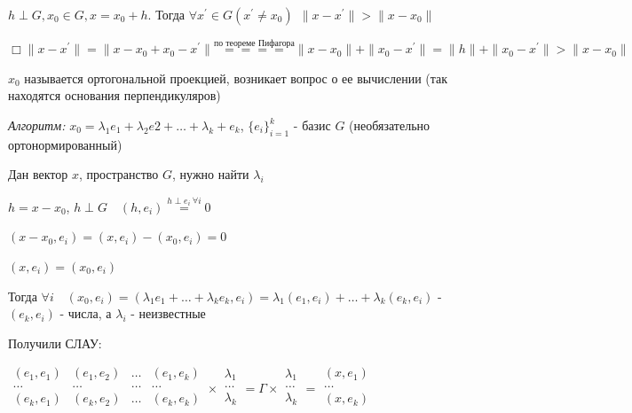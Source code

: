 \documentclass[12pt]{article}
\begin{document}
    \Th $\displaystyle h \perp G, x_0 \in G, x = x_0 + h$. Тогда $\displaystyle \forall x^\prime \in G (x^\prime \neq x_0) \ \ \|x - x^\prime\| > \|x - x_0\|$

    $\displaystyle \Box \|x - x^\prime\| = \|x - x_0 + x_0 - x^\prime\| \stackrel{\text{по теореме Пифагора}}{====} \|x - x_0\| + \|x_0 - x^\prime\| = \|h\| + \|x_0 - x^\prime\| > \|x - x_0\|$

    \Nota $\displaystyle x_0$ называется ортогональной проекцией, возникает вопрос о ее вычислении (так находятся основания перпендикуляров)

    \vspace{5mm}

    \textit{Алгоритм:} $\displaystyle x_0 = \lambda_1 e_1 + \lambda_2 e2 + \dots + \lambda_k + e_k$, $\displaystyle \{e_i\}^k_{i=1}$ - базис $G$ (необязательно ортонормированный)

    Дан вектор $x$, пространство $G$, нужно найти $\displaystyle \lambda_i$

    $\displaystyle h = x - x_0$, $\displaystyle h \perp G \quad  (h, e_i) \stackrel{h \perp e_i \ \forall i}{=} 0$

    $\displaystyle (x - x_0, e_i) = (x, e_i) - (x_0, e_i) = 0$

    $\displaystyle (x, e_i) = (x_0, e_i)$

    Тогда $\displaystyle \forall i \quad (x_0, e_i) = (\lambda_1 e_1 + \dots + \lambda_k e_k, e_i) = \lambda_1 (e_1, e_i) + \dots + \lambda_k (e_k, e_i)$ - $\displaystyle (e_k, e_i)$ - числа, а $\displaystyle \lambda_i$ - неизвестные

    Получили СЛАУ:

    $\displaystyle \begin{array}{|cccc|}
    (e_1, e_1) & (e_1, e_2) & \ldots & (e_1, e_k)\\
    \ldots & \ldots & \ldots & \ldots\\
    (e_k, e_1) & (e_k, e_2) & \ldots & (e_k, e_k)\\
    \end{array} \times \begin{array}{|c|}
    \lambda_1\\
    \ldots\\
    \lambda_k \\
    \end{array} = \Gamma \times \begin{array}{|c|}
    \lambda_1\\
    \ldots\\
    \lambda_k \\
    \end{array} = \begin{array}{|c|}
    (x,e_1)\\
    \ldots\\
    (x,e_k) \\
    \end{array}$
\end{document}
